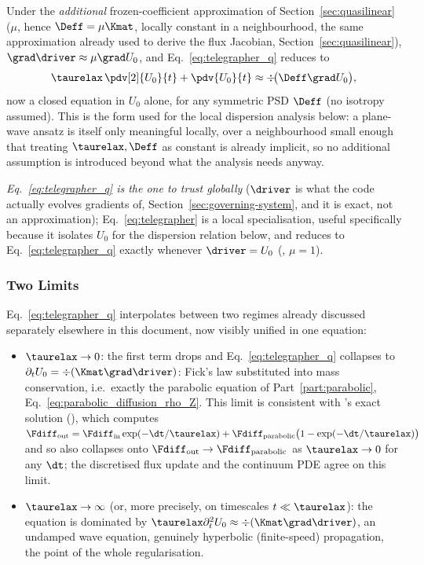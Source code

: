\begin{corollary}
\label{cor:telegrapher_local}
Under the \emph{additional} frozen-coefficient approximation of
Section~\ref{sec:quasilinear} ($\mu$, hence $\Deff=\mu\Kmat$, locally
constant in a neighbourhood, the same approximation already used to
derive the flux Jacobian, Section~\ref{sec:quasilinear}), $\grad\driver
\approx\mu\grad U_0$, and Eq.~\eqref{eq:telegrapher_q} reduces to
\begin{equation}
  \label{eq:telegrapher}
  \taurelax\,\pdv[2]{U_0}{t} + \pdv{U_0}{t} \approx \div\!\big(\Deff\grad U_0\big) ,
\end{equation}
now a closed equation in $U_0$ alone, for any symmetric PSD $\Deff$ (no
isotropy assumed). This is the form used for the local dispersion analysis
below: a plane-wave ansatz is itself only meaningful locally, over a
neighbourhood small enough that treating $\taurelax,\Deff$ as constant is
already implicit, so no additional assumption is introduced beyond what
the analysis needs anyway.
\end{corollary}
\emph{Eq.~\eqref{eq:telegrapher_q} is the one to trust globally}
($\driver$ is what the code actually evolves gradients of,
Section~\ref{sec:governing-system}, and it is exact, not an
approximation); Eq.~\eqref{eq:telegrapher} is a local specialisation,
useful specifically because it isolates $U_0$ for the dispersion relation
below, and reduces to Eq.~\eqref{eq:telegrapher_q} exactly whenever
$\driver=U_0$ (, $\mu=1$).

\subsubsection{Two Limits}
Eq.~\eqref{eq:telegrapher_q} interpolates between two regimes already
discussed separately elsewhere in this document, now visibly unified in
one equation:
\begin{itemize}
\item $\taurelax\to0$: the first term drops and
  Eq.~\eqref{eq:telegrapher_q} collapses to
  $\partial_tU_0=\div(\Kmat\grad \driver)$: Fick's law substituted into
  mass conservation, i.e.\ exactly the parabolic equation of
  Part~\ref{part:parabolic}, Eq.~\eqref{eq:parabolic_diffusion_rho_Z}.
  This limit is consistent with
  's exact solution
  (), which computes
  $\Fdiff_{\rm out}=\Fdiff_{\rm in}\exp(-\dt/\taurelax)+\Fdiff_{\rm
  parabolic}\big(1-\exp(-\dt/\taurelax)\big)$ and so also collapses onto
  $\Fdiff_{\rm out}\to\Fdiff_{\rm parabolic}$ as $\taurelax\to0$ for any
  $\dt$; the discretised flux update and the continuum PDE agree on
  this limit.
\item $\taurelax\to\infty$ (or, more precisely, on timescales
  $t\ll\taurelax$): the equation is dominated by
  $\taurelax\partial_t^2U_0\approx\div(\Kmat\grad\driver)$, an
  undamped wave equation, genuinely hyperbolic (finite-speed)
  propagation, the point of the whole regularisation.
\end{itemize}

